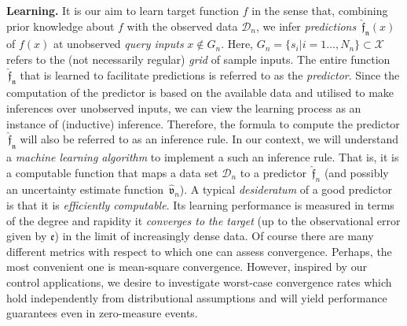 \documentclass{article} %
\theoremstyle{definition}
\theoremstyle{remark}
\newcommand{\data}{\ensuremath{ \mathcal D} }
\newcommand{\inspace}{\ensuremath{ \mathcal X}}
\newcommand{\grid}{\ensuremath{  G}}
\newcommand{\predf}{\, \mathfrak{  \hat f}} %
\newcommand{\predfn}{\, \mathfrak{  \hat f_n}} %
\newcommand{\prederr}{\, \mathfrak{\hat v}} %
\newcommand{\obserr}{\mathfrak e} %
\begin{document}
\textbf{Learning.}
It is our aim to learn target function $f$ in the sense that, combining prior knowledge about $f$ with the observed data $\data_n$, we infer \textit{predictions} $\predfn(x)$ of $f(x)$ at unobserved \textit{query inputs} $x \notin \grid_n$. Here, $\grid_n =\{s_i | i =1\ldots,N_n\} \subset \inspace$ refers to the (not necessarily regular) \emph{grid} of sample inputs. The entire function $\predfn$ that is learned to facilitate predictions is referred to as the \textit{predictor}. Since the computation of the predictor is based on the available data and utilised to make inferences over unobserved inputs, we can view the learning process as an instance of (inductive) inference. Therefore, the formula to compute the predictor $\predfn$ will also be referred to as an inference rule.
%
%
In our context, we will understand a \textit{machine learning algorithm} to implement a such an inference rule. That is, it is a computable function that maps a data set $\data_n $ to a 
 predictor $\predf_n$ (and possibly an uncertainty estimate function $\prederr_n$). 
A typical \textit{desideratum} of a good predictor is that it is \textit{efficiently computable}. Its learning performance is measured in terms of the degree and rapidity it  \textit{converges to the target} (up to the observational error given by $\obserr$) in the limit of increasingly dense data. Of course there are many different metrics with respect to which one can assess convergence. Perhaps, the most convenient one is mean-square convergence. However, inspired by our control applications, we desire to investigate worst-case convergence rates which hold independently from distributional assumptions and will yield performance guarantees even in zero-measure events.
\end{document}
